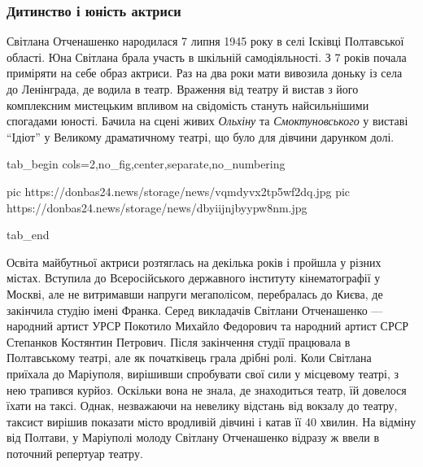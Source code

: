  
 
 
 
 

\subsubsection{Дитинство і юність актриси}

Світлана Отченашенко народилася 7 липня 1945 року в селі Ісківці Полтавської
області. Юна Світлана брала участь в шкільній самодіяльності. З 7 років почала
приміряти на себе образ актриси. Раз на два роки мати вивозила доньку із села
до Ленінграда, де водила в театр. Враження від театру й вистав з його
комплексним мистецьким впливом на свідомість стануть найсильнішими спогадами
юності. Бачила на сцені живих \emph{Ольхіну} та \emph{Смоктуновського} у виставі \enquote{Ідіот} у
Великому драматичному театрі, що було для дівчини дарунком долі.

\ifcmt
  tab_begin cols=2,no_fig,center,separate,no_numbering

     pic https://donbas24.news/storage/news/vqmdyvx2tp5wf2dq.jpg
		 pic https://donbas24.news/storage/news/dbyiijnjbyypw8nm.jpg

  tab_end
\fi

Освіта майбутньої актриси розтяглась на декілька років і пройшла у різних
містах. Вступила до Всеросійського державного інституту кінематографії у
Москві, але не витримавши напруги мегаполісом, перебралась до Києва, де
закінчила студію імені Франка. Серед викладачів Світлани Отченашенко — народний
артист УРСР Покотило Михайло Федорович та народний артист СРСР Степанков
Костянтин Петрович. Після закінчення студії працювала в Полтавському театрі,
але як початківець грала дрібні ролі. Коли Світлана приїхала до Маріуполя,
вирішивши спробувати свої сили у місцевому театрі, з нею трапився курйоз.
Оскільки вона не знала, де знаходиться театр, їй довелося їхати на таксі.
Однак, незважаючи на невелику відстань від вокзалу до театру, таксист вирішив
показати місто вродливій дівчині і катав її 40 хвилин. На відміну від Полтави,
у Маріуполі молоду Світлану Отченашенко відразу ж ввели в поточний репертуар
театру.

